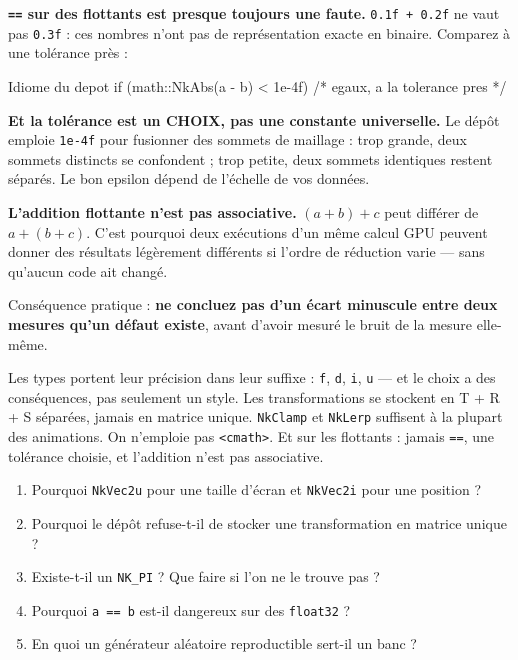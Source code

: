 \begin{nkpiege}
\textbf{\texttt{==} sur des flottants est presque toujours une faute.}
\texttt{0.1f + 0.2f} ne vaut pas \texttt{0.3f} : ces nombres n'ont pas de
représentation exacte en binaire. Comparez à une tolérance près :

\begin{nkcode}{Idiome du depot}
if (math::NkAbs(a - b) < 1e-4f) { /* egaux, a la tolerance pres */ }
\end{nkcode}

\textbf{Et la tolérance est un CHOIX, pas une constante universelle.} Le dépôt
emploie \texttt{1e-4f} pour fusionner des sommets de maillage : trop grande, deux
sommets distincts se confondent ; trop petite, deux sommets identiques restent
séparés. Le bon epsilon dépend de l'échelle de vos données.
\end{nkpiege}

\begin{nkpiege}
\textbf{L'addition flottante n'est pas associative.} $(a+b)+c$ peut différer de
$a+(b+c)$. C'est pourquoi deux exécutions d'un même calcul GPU peuvent donner des
résultats légèrement différents si l'ordre de réduction varie --- sans qu'aucun
code ait changé.

Conséquence pratique : \textbf{ne concluez pas d'un écart minuscule entre deux
mesures qu'un défaut existe}, avant d'avoir mesuré le bruit de la mesure
elle-même.
\end{nkpiege}

\begin{nkbilan}
Les types portent leur précision dans leur suffixe : \texttt{f}, \texttt{d},
\texttt{i}, \texttt{u} --- et le choix a des conséquences, pas seulement un
style. Les transformations se stockent en T + R + S séparées, jamais en matrice
unique. \texttt{NkClamp} et \texttt{NkLerp} suffisent à la plupart des
animations. On n'emploie pas \texttt{<cmath>}. Et sur les flottants : jamais
\texttt{==}, une tolérance choisie, et l'addition n'est pas associative.
\end{nkbilan}

\begin{nkquestions}
\begin{enumerate}
\item Pourquoi \texttt{NkVec2u} pour une taille d'écran et \texttt{NkVec2i} pour
      une position ?
\item Pourquoi le dépôt refuse-t-il de stocker une transformation en matrice
      unique ?
\item Existe-t-il un \texttt{NK\_PI} ? Que faire si l'on ne le trouve pas ?
\item Pourquoi \texttt{a == b} est-il dangereux sur des \texttt{float32} ?
\item En quoi un générateur aléatoire reproductible sert-il un banc ?
\end{enumerate}
\end{nkquestions}

